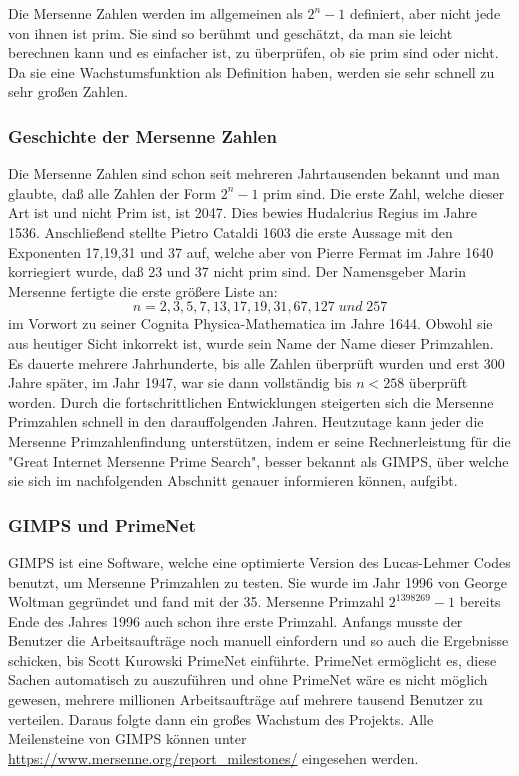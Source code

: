 Die Mersenne Zahlen werden im allgemeinen als $2^{n}-1 $ definiert, aber nicht jede von ihnen ist prim. Sie sind so berühmt und geschätzt, da man sie leicht berechnen kann und es einfacher ist, zu überprüfen, ob sie prim sind oder nicht. Da sie eine Wachstumsfunktion als Definition haben, werden sie sehr schnell zu sehr großen Zahlen.
\subsubsection{Geschichte der Mersenne Zahlen}
Die Mersenne Zahlen sind schon seit mehreren Jahrtausenden bekannt und man glaubte, daß alle Zahlen der Form $2^{n}-1$ prim sind. Die erste Zahl, welche dieser Art ist und nicht Prim ist, ist 2047. Dies bewies Hudalcrius Regius im Jahre 1536. Anschließend stellte Pietro Cataldi 1603 die erste Aussage mit den Exponenten 17,19,31 und 37 auf, welche aber von Pierre Fermat im Jahre 1640 korriegiert wurde, daß 23 und 37 nicht prim sind. Der Namensgeber Marin Mersenne fertigte die erste größere Liste an: 
\[n=2,3,5,7,13,17,19,31,67,127\; und\; 257\]
im Vorwort zu seiner Cognita Physica-Mathematica im Jahre 1644.
Obwohl sie aus heutiger Sicht inkorrekt ist, wurde sein Name der Name dieser Primzahlen. Es dauerte mehrere Jahrhunderte, bis alle Zahlen überprüft wurden und erst 300 Jahre später, im Jahr 1947, war sie dann vollständig bis $n<258$ überprüft worden. Durch die fortschrittlichen Entwicklungen steigerten sich die Mersenne Primzahlen schnell in den darauffolgenden Jahren. Heutzutage kann jeder die Mersenne Primzahlenfindung unterstützen, indem er seine Rechnerleistung für die "Great Internet Mersenne Prime Search", besser bekannt als GIMPS, über welche sie sich im nachfolgenden Abschnitt genauer informieren können, aufgibt.
\subsubsection{GIMPS und PrimeNet}
GIMPS ist eine Software, welche eine optimierte Version des Lucas-Lehmer Codes benutzt, um Mersenne Primzahlen zu testen. Sie wurde im Jahr 1996 von George Woltman gegründet und fand mit der 35. Mersenne Primzahl $2^{1398269}-1$ bereits Ende des Jahres 1996 auch schon ihre erste Primzahl. Anfangs musste der Benutzer die Arbeitsaufträge noch manuell einfordern und so auch die Ergebnisse schicken, bis Scott Kurowski PrimeNet einführte. PrimeNet ermöglicht es, diese Sachen automatisch zu auszuführen und ohne PrimeNet wäre es nicht möglich gewesen, mehrere millionen Arbeitsaufträge auf mehrere tausend Benutzer zu verteilen. Daraus folgte dann ein großes Wachstum des Projekts. Alle Meilensteine von GIMPS können unter \url{https://www.mersenne.org/report_milestones/} eingesehen werden.
\newpage 
